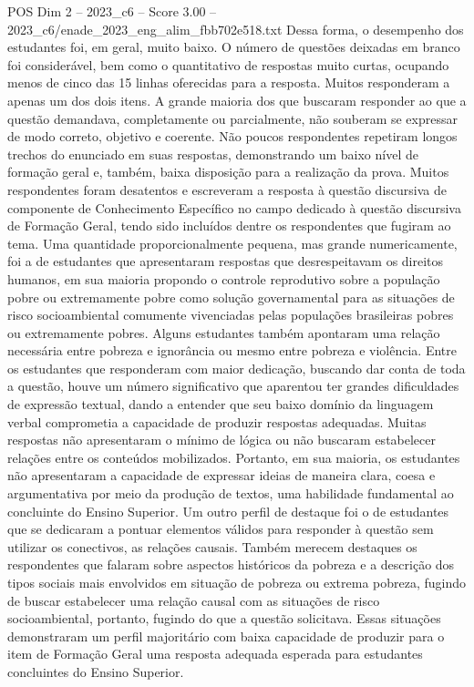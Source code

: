 \begin{textsample}{POS Dim 2 – 2023\_c6 – Score 3.00 – 2023\_c6/enade\_2023\_eng\_alim\_fbb702e518.txt}
Dessa forma, o desempenho dos estudantes foi, em geral, muito baixo.
O número de questões deixadas em branco foi considerável, bem como o quantitativo de respostas muito curtas, ocupando menos de cinco das 15 linhas oferecidas para a resposta.
Muitos responderam a apenas um dos dois itens.
A grande maioria dos que buscaram responder ao que a questão demandava, completamente ou parcialmente, não souberam se expressar de modo correto, objetivo e coerente.
Não poucos respondentes repetiram longos trechos do enunciado em suas respostas, demonstrando um baixo nível de formação geral e, também, baixa disposição para a realização da prova.
Muitos respondentes foram desatentos e escreveram a resposta à questão discursiva de componente de Conhecimento Específico no campo dedicado à questão discursiva de Formação Geral, tendo sido incluídos dentre os respondentes que fugiram ao tema.
Uma quantidade proporcionalmente pequena, mas grande numericamente, foi a de estudantes que apresentaram respostas que desrespeitavam os direitos humanos, em sua maioria propondo o controle reprodutivo sobre a população pobre ou extremamente pobre como solução governamental para as situações de risco socioambiental comumente vivenciadas pelas populações brasileiras pobres ou extremamente pobres.
Alguns estudantes também apontaram uma relação necessária entre pobreza e ignorância ou mesmo entre pobreza e violência.
Entre os estudantes que responderam com maior dedicação, buscando dar conta de toda a questão, houve um número significativo que aparentou ter grandes dificuldades de expressão textual, dando a entender que seu baixo domínio da linguagem verbal comprometia a capacidade de produzir respostas adequadas.
Muitas respostas não apresentaram o mínimo de lógica ou não buscaram estabelecer relações entre os conteúdos mobilizados.
Portanto, em sua maioria, os estudantes não apresentaram a capacidade de expressar ideias de maneira clara, coesa e argumentativa por meio da produção de textos, uma habilidade fundamental ao concluinte do Ensino Superior.
Um outro perfil de destaque foi o de estudantes que se dedicaram a pontuar elementos válidos para responder à questão sem utilizar os conectivos, as relações causais.
Também merecem destaques os respondentes que falaram sobre aspectos históricos da pobreza e a descrição dos tipos sociais mais envolvidos em situação de pobreza ou extrema pobreza, fugindo de buscar estabelecer uma relação causal com as situações de risco socioambiental, portanto, fugindo do que a questão solicitava.
Essas situações demonstraram um perfil majoritário com baixa capacidade de produzir para o item de Formação Geral uma resposta adequada esperada para estudantes concluintes do Ensino Superior.

\end{textsample}
